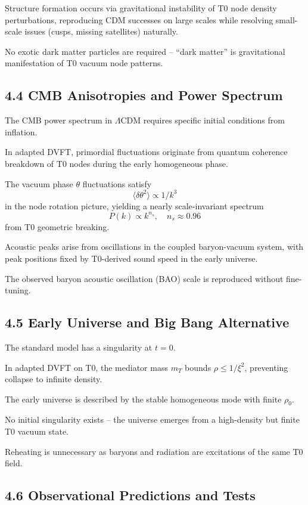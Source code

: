 \documentclass[12pt,a4paper]{article}
\begin{document}
	Structure formation occurs via gravitational instability of T0 node density perturbations, reproducing CDM successes on large scales while resolving small-scale issues (cusps, missing satellites) naturally.
	
	No exotic dark matter particles are required – ``dark matter'' is gravitational manifestation of T0 vacuum node patterns.
	
	\subsection{4.4 CMB Anisotropies and Power Spectrum}
	
	The CMB power spectrum in $\Lambda$CDM requires specific initial conditions from inflation.
	
	In adapted DVFT, primordial fluctuations originate from quantum coherence breakdown of T0 nodes during the early homogeneous phase.
	
	The vacuum phase $\theta$ fluctuations satisfy
	\[
	\langle \delta \theta^2 \rangle \propto 1/k^3
	\]
	in the node rotation picture, yielding a nearly scale-invariant spectrum
	\[
	P(k) \propto k^{n_s}, \quad n_s \approx 0.96
	\]
	from T0 geometric breaking.
	
	Acoustic peaks arise from oscillations in the coupled baryon-vacuum system, with peak positions fixed by T0-derived sound speed in the early universe.
	
	The observed baryon acoustic oscillation (BAO) scale is reproduced without fine-tuning.
	
	\subsection{4.5 Early Universe and Big Bang Alternative}
	
	The standard model has a singularity at $t=0$.
	
	In adapted DVFT on T0, the mediator mass $m_T$ bounds $\rho \leq 1/\xi^2$, preventing collapse to infinite density.
	
	The early universe is described by the stable homogeneous mode with finite $\rho_0$.
	
	No initial singularity exists – the universe emerges from a high-density but finite T0 vacuum state.
	
	Reheating is unnecessary as baryons and radiation are excitations of the same T0 field.
	
	\subsection{4.6 Observational Predictions and Tests}
	
\end{document}

